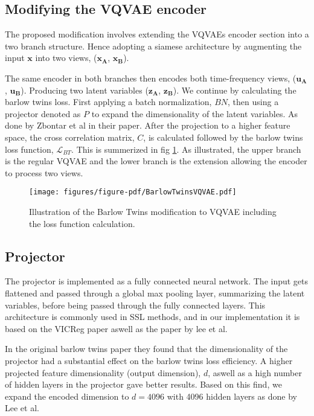 \subsection{Modifying the VQVAE encoder}
The proposed modification involves extending the VQVAEs encoder section into a two branch structure. Hence adopting a siamese architecture by augmenting 
the input $\mathbf{x}$ into two views, ($\mathbf{x_A}$, $\mathbf{x_B}$).

The same encoder in both branches then encodes both time-frequency views, ($\mathbf{u_A}$, $\mathbf{u_B}$). Producing two latent variables ($\mathbf{z_A}$, $\mathbf{z_B}$). We continue by calculating the barlow twins loss. First applying a batch normalization, $BN$, then using a projector denoted as $P$ to expand the dimensionality of the latent variables. As done by Zbontar et al in their paper\cite{Barlow}.
After the projection to a higher feature space, the cross correlation matrix, $C$, is calculated followed by the barlow twins loss function, $\mathcal{L}_{BT}$. This is summerized in fig \ref{fig:BTVQVAE}. 
As illustrated, the upper branch is the regular VQVAE and the lower branch is the extension allowing the encoder to process two views.

\begin{figure}[H]
    \texttt{[image: figures/figure-pdf/BarlowTwinsVQVAE.pdf]}
    \caption{Illustration of the Barlow Twins modification to VQVAE including the loss function calculation.}
    \label{fig:BTVQVAE}
\end{figure}

\subsection{Projector}
The projector is implemented as a fully connected neural network. The input gets flattened and passed through a global max pooling layer, summarizing the latent variables, before being passed through the fully connected layers.
This architecture is commonly used in SSL methods, and in our implementation it is based on the VICReg paper\cite{VICReg} aswell as the paper by lee et al\cite{SSLs}.

In the original barlow twins paper \cite{Barlow} they found that the dimensionality of the projector had a substantial effect on the barlow twins loss efficiency. A higher projected feature dimensionality (output dimension), $d$, aswell as a high number of hidden layers in the projector
gave better results. Based on this find, we expand the encoded dimension to $d=4096$ with 4096 hidden layers as done by Lee et al\cite{SSLs}.

